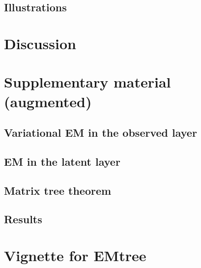 \subsection{Illustrations}  \label{sec:illustration}

\section{Discussion} 
\begin{subappendices}
\section{Supplementary material (augmented)}
\subsection{Variational EM in the observed layer} \label{app:VEM} 
\subsection{EM in the latent layer} \label{app:EM} 
\subsection{Matrix tree theorem}\label{app:MTT} 
\subsection{Results}\label{app:results} 
\newpage
\section{Vignette for EMtree}
\end{subappendices}

